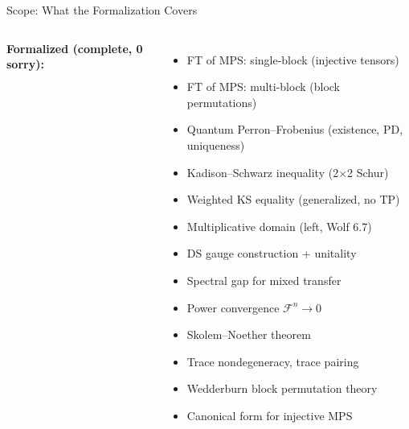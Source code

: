 \documentclass[aspectratio=169,10pt]{beamer}
\begin{document}
\begin{frame}{Scope: What the Formalization Covers}
    \vspace{-0.5em}

    \begin{columns}[T]
        \textbf{\textcolor{leangreen}{Formalized (complete, 0 sorry):}}
        \begin{itemize}\itemsep0.08em\scriptsize
            \item[\textcolor{leangreen}{\checkmark}] FT of MPS: single-block (injective tensors)
            \item[\textcolor{leangreen}{\checkmark}] FT of MPS: multi-block (block permutations)
            \item[\textcolor{leangreen}{\checkmark}] Quantum Perron--Frobenius (existence, PD, uniqueness)
            \item[\textcolor{leangreen}{\checkmark}] Kadison--Schwarz inequality (2$\times$2 Schur)
            \item[\textcolor{leangreen}{\checkmark}] Weighted KS equality (generalized, no TP)
            \item[\textcolor{leangreen}{\checkmark}] Multiplicative domain (left, Wolf 6.7)
            \item[\textcolor{leangreen}{\checkmark}] DS gauge construction + unitality
            \item[\textcolor{leangreen}{\checkmark}] Spectral gap for mixed transfer
            \item[\textcolor{leangreen}{\checkmark}] Power convergence $\mathcal{F}^n \to 0$
            \item[\textcolor{leangreen}{\checkmark}] Skolem--Noether theorem
            \item[\textcolor{leangreen}{\checkmark}] Trace nondegeneracy, trace pairing
            \item[\textcolor{leangreen}{\checkmark}] Wedderburn block permutation theory
            \item[\textcolor{leangreen}{\checkmark}] Canonical form for injective MPS
        \end{itemize}


\end{columns}
\end{frame}
\end{document}
